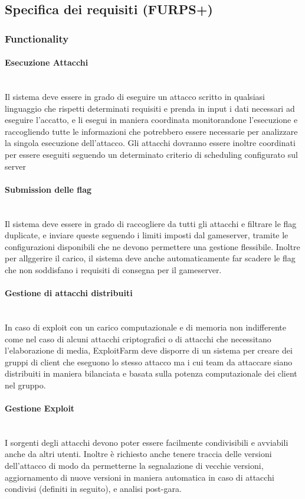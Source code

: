 \documentclass[11pt]{article}
\begin{document}
\subsection{Specifica dei requisiti (FURPS+)}

\subsubsection{Functionality}
\paragraph{Esecuzione Attacchi}\mbox{}\\
Il sistema deve essere in grado di eseguire un attacco scritto in qualsiasi linguaggio che rispetti determinati requisiti e prenda in input i dati necessari ad eseguire l'accatto, e li esegui in maniera coordinata monitorandone l'esecuzione e raccogliendo tutte le informazioni che potrebbero essere necessarie per analizzare la singola esecuzione dell'attacco. Gli attacchi dovranno essere inoltre coordinati per essere eseguiti seguendo un determinato criterio di scheduling configurato sul server
\paragraph{Submission delle flag}\mbox{}\\
Il sistema deve essere in grado di raccogliere da tutti gli attacchi e filtrare le flag duplicate, e inviare queste seguendo i limiti imposti dal gameserver, tramite le configurazioni disponibili che ne devono permettere una gestione flessibile. Inoltre per allggerire il carico, il sistema deve anche automaticamente far scadere le flag che non soddisfano i requisiti di consegna per il gameserver.
\paragraph{Gestione di attacchi distribuiti}\mbox{}\\
In caso di exploit con un carico computazionale e di memoria non indifferente come nel caso di alcuni attacchi criptografici o di attacchi che necessitano l'elaborazione di media, ExploitFarm deve disporre di un sistema per creare dei gruppi di client che eseguono lo stesso attacco ma i cui team da attaccare siano distribuiti in maniera bilanciata e basata sulla potenza computazionale dei client nel gruppo.
\paragraph{Gestione Exploit}\mbox{}\\
I sorgenti degli attacchi devono poter essere facilmente condivisibili e avviabili anche da altri utenti. Inoltre è richiesto anche tenere traccia delle versioni dell'attacco di modo da permetterne la segnalazione di vecchie versioni, aggiornamento di nuove versioni in maniera automatica in caso di attacchi condivisi (definiti in seguito), e analisi post-gara.
\end{document}
